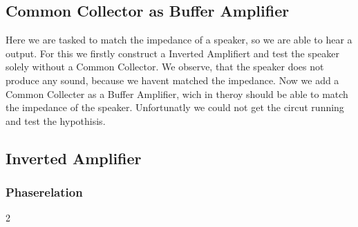 \documentclass[a4paper,10pt]{article}
\numberwithin{equation}{section}
\begin{document}
\begin{multicols}{2}
  \subsection{Common Collector as Buffer Amplifier}
  Here we are tasked to match the impedance of a speaker, so we are able to hear a output. For this we firstly construct a Inverted Amplifiert and test the speaker solely without a Common Collector. We observe, that the speaker does not produce any sound, because we havent matched the impedance. Now we add a Common Collecter as a Buffer Amplifier, wich in theroy should be able to match the impedance of the speaker. Unfortunatly we could not get the circut running and test the hypothisis. 
  \subsection{Inverted Amplifier}
  \subsubsection{Phaserelation}




\end{multicols}{2}

\clearpage
\listoffigures
\listoftables



\end{document}
